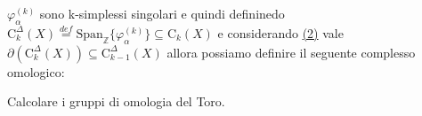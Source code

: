 \documentclass[11pt, a4paper, twoside]{article}
\begin{document}
\begin{oss}
	$\varphi_{\alpha}^{(k)}$ sono k-simplessi singolari e quindi defininedo $\text{C}_k^{\Delta}(X)\stackrel{def}=\text{Span}_{\mathbb{Z}}\{\varphi_{\alpha}^{(k)}\}\subseteq\text{C}_k(X)$ e considerando \hyperref[due]{(2)} vale $\partial\left(\text{C}_k^{\Delta}(X)\right)\subseteq\text{C}_{k-1}^{\Delta}(X)$ allora possiamo definire il seguente complesso omologico:
	\begin{center}
	\end{center}
\end{oss}

\begin{ese}
	Calcolare i gruppi di omologia del Toro.
\end{ese}
\end{document}
